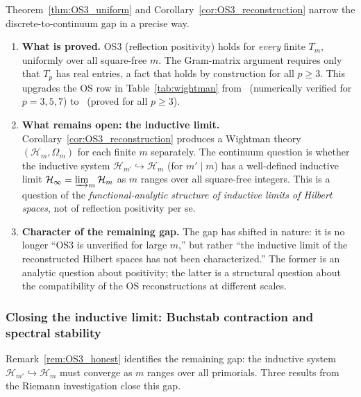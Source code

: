 \documentclass[12pt,a4paper]{article}
\begin{document}
\begin{remark}\mBR
\label{rem:OS3_honest}
Theorem~\ref{thm:OS3_uniform} and Corollary~\ref{cor:OS3_reconstruction}
narrow the discrete-to-continuum gap in a precise way.

\begin{enumerate}[nosep]
\item \textbf{What is proved.}
  OS3 (reflection positivity) holds for \emph{every} finite $T_m$,
  uniformly over all square-free $m$.
  The Gram-matrix argument requires only that $T_p$ has real entries,
  a fact that holds by construction for all $p \geq 3$.
  This upgrades the OS row in Table~\ref{tab:wightman} from
  \VALTAG\ (numerically verified for $p = 3, 5, 7$) to
  \THMTAG\ (proved for all $p \geq 3$).

\item \textbf{What remains open: the inductive limit.}
  Corollary~\ref{cor:OS3_reconstruction} produces a Wightman theory
  $(\mathcal{H}_m, \Omega_m)$ for each finite $m$ separately.
  The continuum question is whether the inductive system
  $\mathcal{H}_{m'} \hookrightarrow \mathcal{H}_m$ (for $m' \mid m$)
  has a well-defined inductive limit
  $\mathcal{H}_\infty = \varinjlim_m \mathcal{H}_m$ as $m$
  ranges over all square-free integers.
  This is a question of the \emph{functional-analytic structure of
  inductive limits of Hilbert spaces}, not of reflection positivity
  per se.

\item \textbf{Character of the remaining gap.}
  The gap has shifted in nature: it is no longer ``OS3 is unverified
  for large $m$,'' but rather ``the inductive limit of the
  reconstructed Hilbert spaces has not been characterized.''
  The former is an analytic question about positivity; the latter is a
  structural question about the compatibility of the OS reconstructions
  at different scales.
\end{enumerate}
\end{remark}

\subsubsection{Closing the inductive limit: Buchstab contraction
            and spectral stability}
\label{sec:ch9_inductive_limit}

Remark~\ref{rem:OS3_honest} identifies the remaining gap:
the inductive system
$\mathcal{H}_{m'} \hookrightarrow \mathcal{H}_m$
must converge as $m$ ranges over all primorials.
Three results from the Riemann investigation close this gap.
\end{document}
